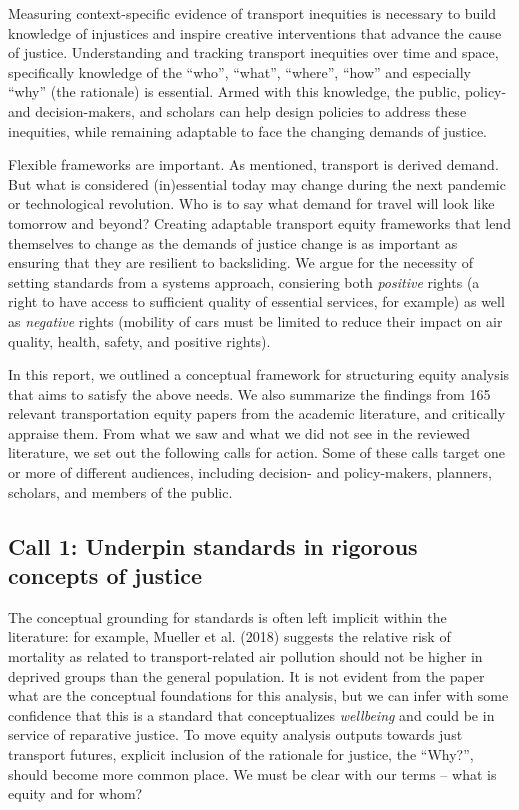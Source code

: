 \documentclass[12pt, oneside]{report}
\begin{document}
Measuring context-specific evidence of transport inequities is necessary
to build knowledge of injustices and inspire creative interventions that
advance the cause of justice. Understanding and tracking transport
inequities over time and space, specifically knowledge of the ``who'',
``what'', ``where'', ``how'' and especially ``why'' (the rationale) is
essential. Armed with this knowledge, the public, policy- and
decision-makers, and scholars can help design policies to address these
inequities, while remaining adaptable to face the changing demands of
justice.

Flexible frameworks are important. As mentioned, transport is derived
demand. But what is considered (in)essential today may change during the
next pandemic or technological revolution. Who is to say what demand for
travel will look like tomorrow and beyond? Creating adaptable transport
equity frameworks that lend themselves to change as the demands of
justice change is as important as ensuring that they are resilient to
backsliding. We argue for the necessity of setting standards from a
systems approach, consiering both \emph{positive} rights (a right to
have access to sufficient quality of essential services, for example) as
well as \emph{negative} rights (mobility of cars must be limited to
reduce their impact on air quality, health, safety, and positive
rights).

In this report, we outlined a conceptual framework for structuring
equity analysis that aims to satisfy the above needs. We also summarize
the findings from 165 relevant transportation equity papers from the
academic literature, and critically appraise them. From what we saw and
what we did not see in the reviewed literature, we set out the following
calls for action. Some of these calls target one or more of different
audiences, including decision- and policy-makers, planners, scholars,
and members of the public.

\hypertarget{call-1-underpin-standards-in-rigorous-concepts-of-justice}{%
\subsection{Call 1: Underpin standards in rigorous concepts of
justice}\label{call-1-underpin-standards-in-rigorous-concepts-of-justice}}

The conceptual grounding for standards is often left implicit within the
literature: for example, Mueller et al. (2018) suggests the relative
risk of mortality as related to transport-related air pollution should
not be higher in deprived groups than the general population. It is not
evident from the paper what are the conceptual foundations for this
analysis, but we can infer with some confidence that this is a standard
that conceptualizes \emph{wellbeing} and could be in service of
reparative justice. To move equity analysis outputs towards just
transport futures, explicit inclusion of the rationale for justice, the
``Why?'', should become more common place. We must be clear with our
terms -- what is equity and for whom?
\end{document}
